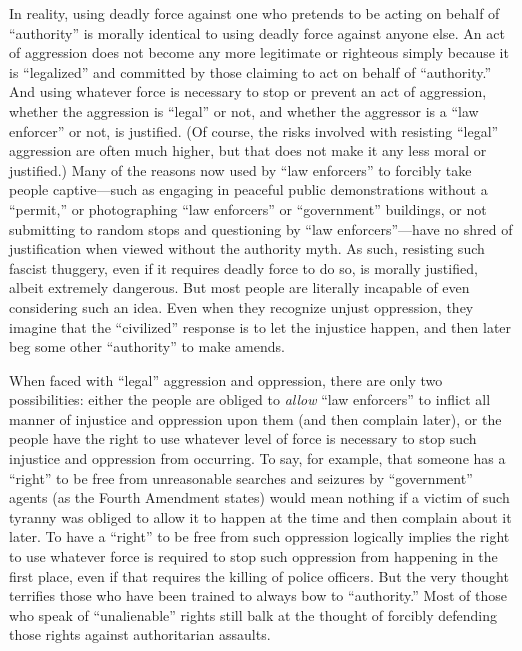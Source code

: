 \documentclass{book}
\begin{document}
In reality, using deadly force against one who pretends to be acting on behalf of \enquote{authority} is morally identical to using deadly force against anyone else. An act of aggression does not become any more legitimate or righteous simply because it is \enquote{legalized} and committed by those claiming to act on behalf of \enquote{authority.} And using whatever force is necessary to stop or prevent an act of aggression, whether the aggression is \enquote{legal} or not, and whether the aggressor is a \enquote{law enforcer} or not, is justified. (Of course, the risks involved with resisting \enquote{legal} aggression are often much higher, but that does not make it any less moral or justified.) Many of the reasons now used by \enquote{law enforcers} to forcibly take people captive---such as engaging in peaceful public demonstrations without a \enquote{permit,} or photographing \enquote{law enforcers} or \enquote{government} buildings, or not submitting to random stops and questioning by \enquote{law enforcers}---have no shred of justification when viewed without the authority myth. As such, resisting such fascist thuggery, even if it requires deadly force to do so, is morally justified, albeit extremely dangerous. But most people are literally incapable of even considering such an idea. Even when they recognize unjust oppression, they imagine that the \enquote{civilized} response is to let the injustice happen, and then later beg some other \enquote{authority} to make amends.

When faced with \enquote{legal} aggression and oppression, there are only two possibilities: either the people are obliged to \emph{allow} \enquote{law enforcers} to inflict all manner of injustice and oppression upon them (and then complain later), or the people have the right to use whatever level of force is necessary to stop such injustice and oppression from occurring. To say, for example, that someone has a \enquote{right} to be free from unreasonable searches and seizures by \enquote{government} agents (as the Fourth Amendment states) would mean nothing if a victim of such tyranny was obliged to allow it to happen at the time and then complain about it later. To have a \enquote{right} to be free from such oppression logically implies the right to use whatever force is required to stop such oppression from happening in the first place, even if that requires the killing of police officers. But the very thought terrifies those who have been trained to always bow to \enquote{authority.} Most of those who speak of \enquote{unalienable} rights still balk at the thought of forcibly defending those rights against authoritarian assaults.
\end{document}
